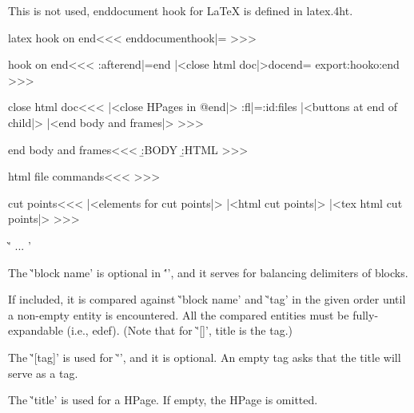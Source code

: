 {{This is not used, enddocument hook for LaTeX is defined in latex.4ht.

\<latex hook on end\><<<
\let\o:enddocumenthook|=\@enddocumenthook
\def\@enddocumenthook{%
   \o:enddocumenthook   \csname export:hook\endcsname  }
>>>





\<hook on end\><<<
\def\at:docend{|<close html doc|>\global\let\at:docend=\empty}
\expand:after{\let\o:end|=}\csname end\endcsname
\expandafter\def\csname end\endcsname{\HtmlEnv
   \at:docend
   \csname export:hook\endcsname   \csname o:end\endcsname}
>>>


\<close html doc\><<<
|<close HPages in @end|>%
\HAssign\op:fl|=\maxfile:id\space  \close:files  
|<buttons at end of child|>%
|<end body and frames|>%
>>>



\<end body and frames\><<<
{\b:BODY \b:HTML}%
>>>


\<html file commands\><<<
\def\close:files{%
   \ifnum \op:fl<\bs:fileid \else
      \def\:warning##1{}%
      \EndFileStream{\RefFileNumber\op:fl}%
      \Advance:\op:fl |by -1
      \expandafter\close:files
   \fi}
>>>





\<cut points\><<<
|<elements for cut points|>
\ifHtml  |<html cut points|>
       |<tex html cut points|>
\fi
>>>



\`' ... '

\List{$\button$}

\item The \`'block name' is optional in \''\EndHPage', and it serves
for balancing delimiters of blocks.   

If included, it is compared against \`'block name' and \`'tag'
in the given order until a non-empty entity is encountered. 
All the compared entities must be fully-expandable (i.e., edef).
(Note that for \`'[]', title is the tag.)

\item The \`'[tag]' is used for \`'\RefFile', and it is optional. 
An empty tag asks that the title will serve as a tag.

\item The \`'{title}' is used for a HPage. If empty, the HPage is omitted.

\EndList

}}
